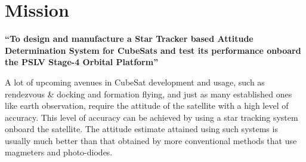 \documentclass[../../main.tex]{subfiles}
\begin{document}
\chapter{Mission}
\thispagestyle{fancy}


\textbf{``To design and manufacture a Star Tracker based Attitude Determination System for CubeSats and test its performance onboard the PSLV Stage-4 Orbital Platform''}

A lot of upcoming avenues in CubeSat development and usage, such as rendezvous \& docking and formation flying, and just as many established ones like earth observation, require the attitude of the satellite with a high level of accuracy. This level of accuracy can be achieved by using a star tracking system onboard the satellite. The attitude estimate attained using such systems is usually much better than that obtained by more conventional methods that use magmeters and photo-diodes.








\end{document}
